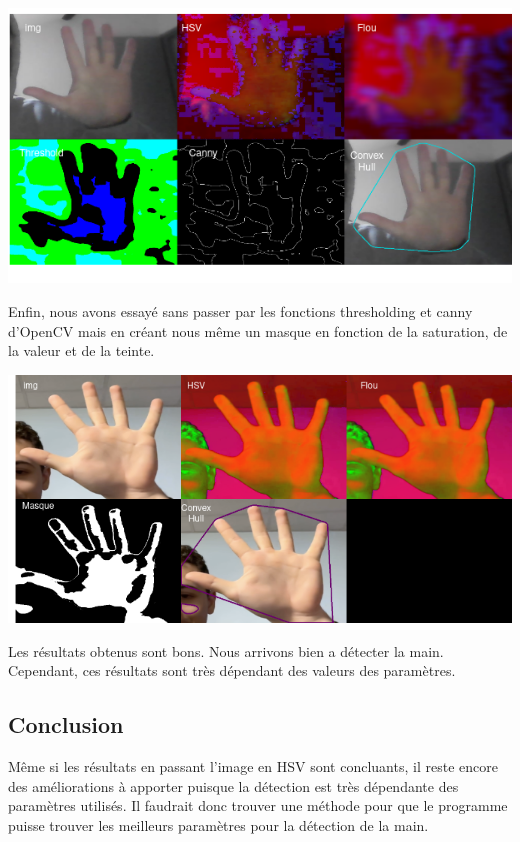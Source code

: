 \documentclass[11pt]{article}
\begin{document}
\begin{center}
    \includegraphics[width=\textwidth]{images/pre_ttt_5.png}
    \end{center}
\bigbreak

Enfin, nous avons essayé sans passer par les fonctions thresholding et canny d'OpenCV mais en créant nous même un masque en fonction de la saturation, de la valeur et de la teinte. \bigbreak

\begin{center}
    \includegraphics[width=\textwidth]{images/pre_ttt_6.png}
\end{center}
\bigbreak

Les résultats obtenus sont bons. Nous arrivons bien a détecter la main. Cependant, ces résultats sont très dépendant des valeurs des paramètres. 

\subsection{Conclusion}
Même si les résultats en passant l'image en HSV sont concluants, il reste encore des améliorations à apporter puisque la détection est très dépendante des paramètres utilisés. Il faudrait donc trouver une méthode pour que le programme puisse trouver les meilleurs paramètres pour la détection de la main. \bigbreak
\end{document}
